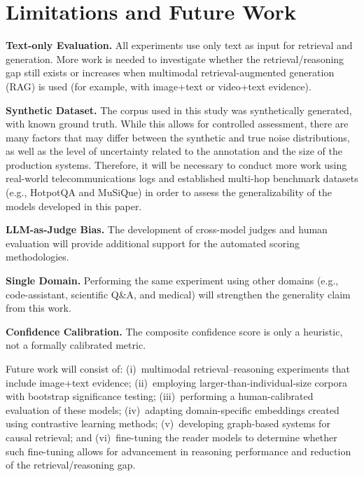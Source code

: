 \documentclass[11pt,a4paper]{article}
\begin{document}
\section{Limitations and Future Work}
\label{sec:limitations}

\textbf{Text-only Evaluation.}
All experiments use only text as input for retrieval and generation.
More work is needed to investigate whether the retrieval/reasoning
gap still exists or increases when multimodal retrieval-augmented
generation (RAG) is used (for example, with image+text or video+text
evidence).

\textbf{Synthetic Dataset.}
The corpus used in this study was synthetically generated, with known
ground truth.
While this allows for controlled assessment, there are many factors
that may differ between the synthetic and true noise distributions,
as well as the level of uncertainty related to the annotation and the
size of the production systems.
Therefore, it will be necessary to conduct more work using real-world
telecommunications logs and established multi-hop benchmark datasets
(e.g., HotpotQA and MuSiQue) in order to assess the
generalizability of the models developed in this paper.

\textbf{LLM-as-Judge Bias.}
The development of cross-model judges and human evaluation will
provide additional support for the automated scoring methodologies.

\textbf{Single Domain.}
Performing the same experiment using other domains (e.g.,
code-assistant, scientific Q\&A, and medical) will strengthen the
generality claim from this work.

\textbf{Confidence Calibration.}
The composite confidence score is only a heuristic, not a formally
calibrated metric.

Future work will consist of: (i)~multimodal retrieval--reasoning
experiments that include image+text evidence; (ii)~employing
larger-than-individual-size corpora with bootstrap significance
testing; (iii)~performing a human-calibrated evaluation of these
models; (iv)~adapting domain-specific embeddings created using
contrastive learning methods; (v)~developing graph-based systems for
causal retrieval; and (vi)~fine-tuning the reader models to
determine whether such fine-tuning allows for advancement in
reasoning performance and reduction of the retrieval/reasoning gap.

\end{document}
